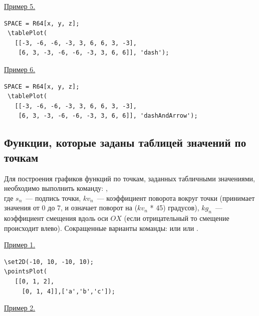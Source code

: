 \underline{Пример 5.}
 
 \vspace*{-2mm}

 \begin{verbatim}
SPACE = R64[x, y, z];
 \tablePlot(
   [[-3, -6, -6, -3, 3, 6, 6, 3, -3],
    [6, 3, -3, -6, -6, -3, 3, 6, 6]], 'dash');
 \end{verbatim}

\underline{Пример 6.}
 
 \vspace*{-2mm}

 \begin{verbatim}
SPACE = R64[x, y, z];
 \tablePlot(
   [[-3, -6, -6, -3, 3, 6, 6, 3, -3],
    [6, 3, -3, -6, -6, -3, 3, 6, 6]], 'dashAndArrow');
 \end{verbatim}

\subsection{Функции, которые заданы таблицей значений по точкам}
Для построения графиков функций по точкам, заданных табличными значениями, необходимо выполнить команду: 
,\\
где $s_{n}$~--- подпись точки, $kv_{n}$~--- коэффициент поворота вокруг точки (принимает значения от 0 до 7, и означает поворот на ($kv_{n}$ * 45) градусов), 
$kg_{n}$~--- коэффициент смещения вдоль оси $OX$ (если отрицательный то смещение происходит влево).
Сокращенные варианты команды:
или
или
.

\underline{Пример 1.}
 
 \vspace*{-2mm}

 \begin{verbatim}
\set2D(-10, 10, -10, 10);
\pointsPlot(
   [[0, 1, 2],
     [0, 1, 4]],['a','b','c']);
 \end{verbatim}

\underline{Пример 2.}
 
